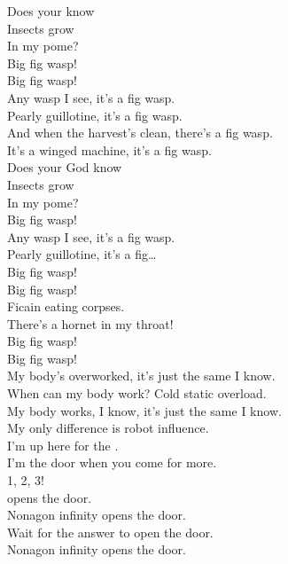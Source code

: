 Does your  know \\
Insects grow \\
In my pome? \\

Big fig wasp! \\
Big fig wasp! \\

Any wasp I see, it's a fig wasp. \\
Pearly guillotine, it's a fig wasp. \\
And when the harvest's clean, there's a fig wasp. \\
It's a winged machine, it's a fig wasp. \\

Does your God know \\
Insects grow \\
In my pome? \\

Big fig wasp! \\

Any wasp I see, it's a fig wasp. \\
Pearly guillotine, it's a fig… \\

Big fig wasp! \\
Big fig wasp! \\

Ficain eating corpses. \\
There's a hornet in my throat! \\

Big fig wasp! \\
Big fig wasp! \\

My body's overworked, it's just the same I know. \\
When can my body work? Cold static overload. \\
My body works, I know, it's just the same I know. \\
My only difference is robot influence. \\

I'm up here for the . \\
I'm the door when you come for more. \\

1, 2, 3! \\

 opens the door. \\
Nonagon infinity opens the door. \\
Wait for the answer to open the door. \\
Nonagon infinity opens the door. \\

